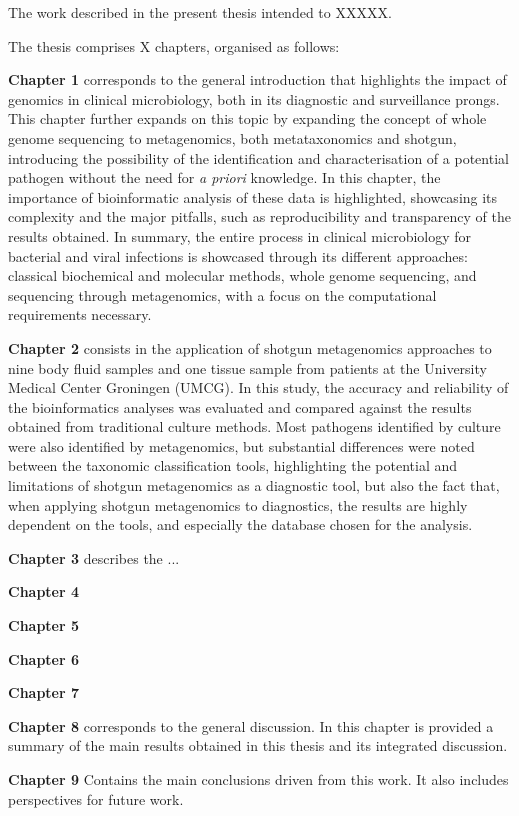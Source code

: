 The work described in the present thesis intended to XXXXX.

The thesis comprises X chapters, organised as follows:

\textbf{Chapter 1} corresponds to the general introduction that highlights the impact of genomics in clinical microbiology, both in its diagnostic and surveillance prongs. This chapter further expands on this topic by expanding the concept of whole genome sequencing to metagenomics, both metataxonomics and shotgun, introducing the possibility of the identification and characterisation of a potential pathogen without the need for \textit{a priori} knowledge. In this chapter, the importance of bioinformatic analysis of these data is highlighted, showcasing its complexity and the major pitfalls, such as reproducibility and transparency of the results obtained. In summary, the entire process in clinical microbiology for bacterial and viral infections is showcased through its different approaches: classical biochemical and molecular methods, whole genome sequencing, and sequencing through metagenomics, with a focus on the computational requirements necessary. 

\textbf{Chapter 2} consists in the application of shotgun metagenomics approaches to  nine body fluid samples and one tissue sample from patients at the University Medical Center Groningen (UMCG). In this study, the accuracy and reliability of the bioinformatics analyses was evaluated and compared against the results obtained from traditional culture methods. Most pathogens identified by culture were also identified by metagenomics, but substantial differences were noted between the taxonomic classification tools, highlighting the potential and limitations of shotgun metagenomics as a diagnostic tool, but also the fact that, when applying shotgun metagenomics to diagnostics, the results are highly dependent on the tools, and especially the database chosen for the analysis.

\textbf{Chapter 3} describes the ...

\textbf{Chapter 4}

\textbf{Chapter 5}

\textbf{Chapter 6}

\textbf{Chapter 7}

\textbf{Chapter 8} corresponds to the general discussion. In this chapter is provided a
summary of the main results obtained in this thesis and its integrated discussion. 

\textbf{Chapter 9} Contains the main conclusions driven from this work. It also includes perspectives for future work. 